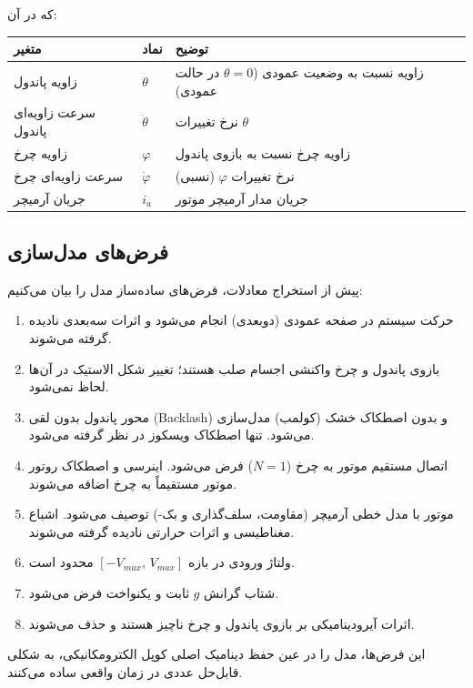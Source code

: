 \noindent که در آن:

\begin{table}[H]
\centering
\begin{tabular}{lll}
\toprule
\textbf{متغیر} & \textbf{نماد} & \textbf{توضیح} \\
\midrule
زاویه پاندول & $\theta$ & زاویه نسبت به وضعیت عمودی ($\theta = 0$ در حالت عمودی) \\
سرعت زاویه‌ای پاندول & $\dot{\theta}$ & نرخ تغییرات $\theta$ \\
زاویه چرخ & $\varphi$ & زاویه چرخ نسبت به بازوی پاندول \\
سرعت زاویه‌ای چرخ & $\dot{\varphi}$ & نرخ تغییرات $\varphi$ (نسبی) \\
جریان آرمیچر & $i_a$ & جریان مدار آرمیچر موتور \\
\bottomrule
\end{tabular}
\end{table}

\subsection{فرض‌های مدل‌سازی}

پیش از استخراج معادلات، فرض‌های ساده‌ساز مدل را بیان می‌کنیم:

\begin{enumerate}
    \item حرکت سیستم در صفحه عمودی (دوبعدی) انجام می‌شود و اثرات سه‌بعدی نادیده گرفته می‌شوند.
    \item بازوی پاندول و چرخ واکنشی اجسام صلب هستند؛ تغییر شکل الاستیک در آن‌ها لحاظ نمی‌شود.
    \item محور پاندول بدون لقی (Backlash) و بدون اصطکاک خشک (کولمب) مدل‌سازی می‌شود. تنها اصطکاک ویسکوز در نظر گرفته می‌شود.
    \item اتصال مستقیم موتور به چرخ ($N = 1$) فرض می‌شود. اینرسی و اصطکاک روتور موتور مستقیماً به چرخ اضافه می‌شوند.
    \item موتور  با مدل خطی آرمیچر (مقاومت، سلف‌گذاری و بک-) توصیف می‌شود. اشباع مغناطیسی و اثرات حرارتی نادیده گرفته می‌شوند.
    \item ولتاژ ورودی در بازه $[-V_{max},\, V_{max}]$ محدود است.
    \item شتاب گرانش $g$ ثابت و یکنواخت فرض می‌شود.
    \item اثرات آیرودینامیکی بر بازوی پاندول و چرخ ناچیز هستند و حذف می‌شوند.
\end{enumerate}

این فرض‌ها، مدل را در عین حفظ دینامیک اصلی کوپل الکترومکانیکی، به شکلی قابل‌حل عددی در زمان واقعی ساده می‌کنند.

